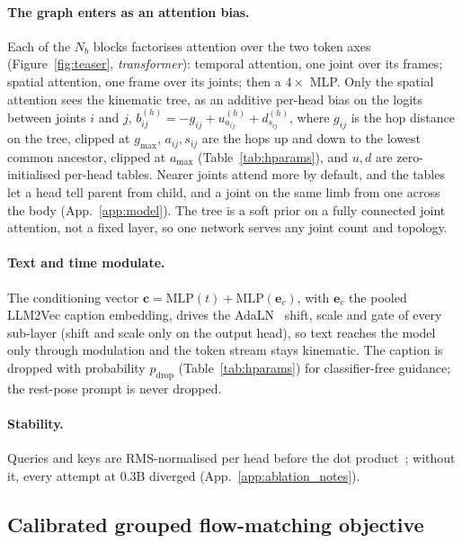 \paragraph{The graph enters as an attention bias.} Each of the $N_b$ blocks factorises attention over the
two token axes (Figure~\ref{fig:teaser}, \emph{transformer}): temporal attention, one joint over its
frames; spatial attention, one frame over its joints; then a $4\times$ MLP. Only the spatial attention
sees the kinematic tree, as an additive per-head bias on the logits between joints $i$ and $j$,
$b^{(h)}_{ij}=-g_{ij}+u^{(h)}_{a_{ij}}+d^{(h)}_{s_{ij}}$, where $g_{ij}$ is the hop distance on the tree,
clipped at $g_{\max}$, $a_{ij},s_{ij}$ are the hops up and down to the lowest common ancestor, clipped at
$a_{\max}$ (Table~\ref{tab:hparams}), and $u,d$ are zero-initialised per-head tables. Nearer joints attend
more by default, and the tables let a head tell parent from child, and a joint on the same limb from one
across the body (App.~\ref{app:model}). The
tree is a soft prior on a fully connected joint attention, not a fixed layer, so one network serves
any joint count and topology.

\paragraph{Text and time modulate.} The conditioning vector
$\mathbf{c}=\mathrm{MLP}(t)+\mathrm{MLP}(\mathbf{e}_c)$, with $\mathbf{e}_c$ the pooled LLM2Vec caption
embedding, drives the AdaLN~\citep{peebles2023dit} shift, scale and gate of every sub-layer (shift and scale
only on the output head), so text reaches the model only through modulation and the token stream stays
kinematic. The caption is dropped with probability $p_{\mathrm{drop}}$ (Table~\ref{tab:hparams}) for
classifier-free guidance; the rest-pose prompt is never dropped.

\paragraph{Stability.} Queries and keys are RMS-normalised per head before the dot
product~\citep{dehghani2023vit22b}; without it, every attempt at 0.3B diverged (App.~\ref{app:ablation_notes}).

\subsection{Calibrated grouped flow-matching objective}\label{sec:method:objective}

